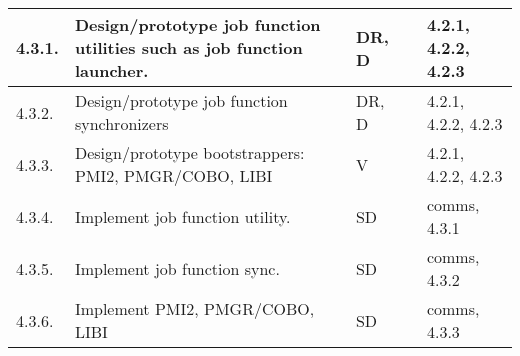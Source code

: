 \begin{longtable}{|p{1cm}|p{10.2cm}|p{1cm}|p{1cm}|p{1.8cm}|}
  \hline
  4.3.1.& Design/prototype job function utilities such as job function
          launcher.
        & DR, D
        & 
        & 4.2.1, 4.2.2, 4.2.3 \\
  \hline
  4.3.2.& Design/prototype job function synchronizers
        & DR, D
        & 
        & 4.2.1, 4.2.2, 4.2.3 \\
  \hline
  4.3.3.& Design/prototype bootstrappers: PMI2, PMGR/COBO, LIBI
        & V
        & 
        & 4.2.1, 4.2.2, 4.2.3 \\
  \hline
  4.3.4.& Implement job function utility.
        & SD
        & 
        & comms, 4.3.1 \\
  \hline
  4.3.5.& Implement job function sync.
        & SD
        & 
        & comms, 4.3.2 \\
  \hline
  4.3.6.& Implement PMI2, PMGR/COBO, LIBI
        & SD
        & 
        & comms, 4.3.3 \\
  \hline
\end{longtable}
\fi
